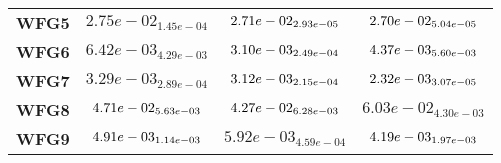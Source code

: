\documentclass{article}
\begin{document}
\begin{table}[!htp]
\begin{scriptsize}
\begin{tabular}{c|ccc}
      \textbf{WFG5} & $2.75e-02_{1.45e-04} $ & $ \cellcolor{gray25} 2.71e-02_{2.93e-05} $ & $ \cellcolor{gray95} 2.70e-02_{5.04e-05}$ \\
      \textbf{WFG6} & $6.42e-03_{4.29e-03} $ & $ \cellcolor{gray95} 3.10e-03_{2.49e-04} $ & $ \cellcolor{gray25} 4.37e-03_{5.60e-03}$ \\
      \textbf{WFG7} & $3.29e-03_{2.89e-04} $ & $ \cellcolor{gray25} 3.12e-03_{2.15e-04} $ & $ \cellcolor{gray95} 2.32e-03_{3.07e-05}$ \\
      \textbf{WFG8} & $\cellcolor{gray25} 4.71e-02_{5.63e-03} $ & $ \cellcolor{gray95} 4.27e-02_{6.28e-03} $ & $ 6.03e-02_{4.30e-03}$ \\
      \textbf{WFG9} & $\cellcolor{gray25} 4.91e-03_{1.14e-03} $ & $ 5.92e-03_{4.59e-04} $ & $ \cellcolor{gray95} 4.19e-03_{1.97e-03}$ \\
  \end{tabular}
  \end{scriptsize}
\end{table}
\end{document}
